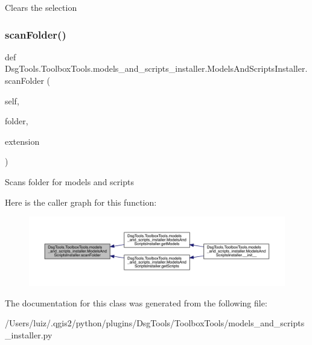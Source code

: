 \begin{DoxyVerb}Clears the selection
\end{DoxyVerb}
 \mbox{\label{class_dsg_tools_1_1_toolbox_tools_1_1models__and__scripts__installer_1_1_models_and_scripts_installer_a88f3a2eac3a885b81a737b8fc4dadb47}} 
\subsubsection{\texorpdfstring{scan\+Folder()}{scanFolder()}}
{\footnotesize\ttfamily def Dsg\+Tools.\+Toolbox\+Tools.\+models\+\_\+and\+\_\+scripts\+\_\+installer.\+Models\+And\+Scripts\+Installer.\+scan\+Folder (\begin{DoxyParamCaption}\item[{}]{self,  }\item[{}]{folder,  }\item[{}]{extension }\end{DoxyParamCaption})}

\begin{DoxyVerb}Scans folder for models and scripts
\end{DoxyVerb}
 Here is the caller graph for this function\+:
\nopagebreak
\begin{figure}[H]
\begin{center}
\leavevmode
\includegraphics[width=350pt]{class_dsg_tools_1_1_toolbox_tools_1_1models__and__scripts__installer_1_1_models_and_scripts_installer_a88f3a2eac3a885b81a737b8fc4dadb47_icgraph}
\end{center}
\end{figure}


The documentation for this class was generated from the following file\+:\begin{DoxyCompactItemize}
\item 
/\+Users/luiz/.\+qgis2/python/plugins/\+Dsg\+Tools/\+Toolbox\+Tools/models\+\_\+and\+\_\+scripts\+\_\+installer.\+py\end{DoxyCompactItemize}

